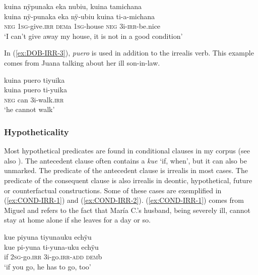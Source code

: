 \ea\label{ex:DOB-IRR-2}
\begingl
\glpreamble kuina nÿpunaka eka nubiu, kuina tamichana\\
\gla kuina nÿ-punaka eka nÿ-ubiu kuina ti-a-michana\\
\glb \textsc{neg} 1\textsc{sg}-give.\textsc{irr} \textsc{dem}a 1\textsc{sg}-house \textsc{neg} 3i-\textsc{irr}-be.nice\\
\glft ‘I can’t give away my house, it is not in a good condition’
\endgl
 \trailingcitation{[mxx-e110820ls.108]}
\xe

In (\ref{ex:DOB-IRR-3}), \textit{puero} is used in addition to the irrealis verb. This example comes from Juana talking about her ill son-in-law.

\ea\label{ex:DOB-IRR-3}
\begingl
\glpreamble kuina puero tiyuika\\
\gla kuina puero ti-yuika\\
\glb \textsc{neg} can 3i-walk.\textsc{irr}\\
\glft ‘he cannot walk’
\endgl
 \trailingcitation{[jxx-p110923l-1.048]}
\xe
{}

\subsubsection{Hypotheticality}\label{sec:Hypotheticality}

Most hypothetical predicates are found in conditional clauses in my corpus (see also ).
The antecedent clause often contains a  \textit{kue} ‘if, when’, but it can also be unmarked. The predicate of the antecedent clause is irrealis in most cases. The predicate of the consequent clause is also irrealis in deontic, hypothetical, future or counterfactual constructions. Some of these cases are exemplified in (\ref{ex:COND-IRR-1}) and (\ref{ex:COND-IRR-2}). 
(\ref{ex:COND-IRR-1}) comes from Miguel and refers to the fact that María C.’s husband, being severely ill, cannot stay at home alone if she leaves for a day or so.

\ea\label{ex:COND-IRR-1}
\begingl 
\glpreamble kue piyuna tiyunauku echÿu\\
\gla kue pi-yuna ti-yuna-uku echÿu\\ 
\glb if 2\textsc{sg}-go.\textsc{irr} 3i-go.\textsc{irr}-\textsc{add} \textsc{dem}b\\ 
\glft ‘if you go, he has to go, too’\\ 
\endgl
 \trailingcitation{[mux-c110810l.042]}
\xe

